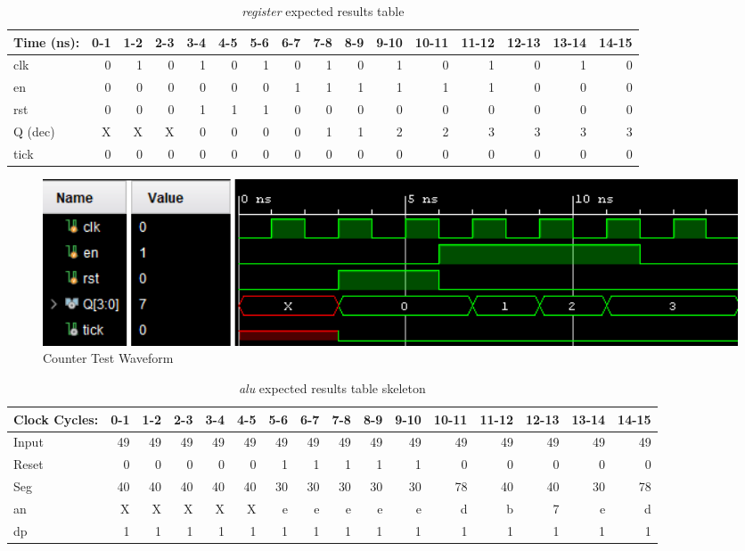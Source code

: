 \documentclass[11pt]{article}
\begin{document}
\begin{table}[ht]\centering
	\caption{\textit{register} expected results table}
	\label{ALU:tbl:register_ERT}\medskip
	\begin{tabular}{l|rrrrrrrrrrrrrrr}
		Time (ns): & 0-1 & 1-2 & 2-3 & 3-4 & 4-5 & 5-6 & 6-7 & 7-8 & 8-9 & 9-10 &10-11& 11-12 & 12-13 & 13-14 & 14-15\\
		\midrule
		clk     & 0 & 1 & 0 & 1 & 0 	& 1 & 0 & 1 & 0 & 1 	& 0 & 1 & 0 & 1 & 0\\
		en  	& 0 & 0 & 0 & 0 & 0 	& 0 & 1 & 1 & 1 & 1 	& 1 & 1 & 0 & 0 & 0\\
		rst 	& 0 & 0 & 0 & 1 & 1 	& 1 & 0 & 0 & 0 & 0 	& 0 & 0 & 0 & 0 & 0\\
		\midrule
		Q (dec) & X & X & X & 0 & 0 	& 0 & 0 & 1 & 1 & 2 	& 2 & 3 & 3 & 3 & 3\\
		tick & 0 & 0 & 0 & 0 & 0 	& 0 & 0 & 0 & 0 & 0 	& 0 & 0 & 0 & 0 & 0\\
		\bottomrule
	\end{tabular}
\end{table}

\begin{figure}[ht]\centering
	\includegraphics[width=1.0\textwidth,trim=0 0mm 0 0,clip]{CounterTest}
	\caption{Counter Test Waveform}
\end{figure}

\clearpage

\begin{table}[ht]\centering
	\caption{\textit{alu} expected results table skeleton}
	\label{ALU:tbl:alu_ERT}\medskip
	\begin{tabular}{l|rrrrrrrrrrrrrrr}
		Clock Cycles:& 0-1 & 1-2 & 2-3 & 3-4 & 4-5 & 5-6 & 6-7 & 7-8 & 8-9 & 9-10 &10-11& 11-12 & 12-13 & 13-14 & 14-15\\
		\midrule
		Input  & 49 & 49 & 49 & 49 & 49 & 49 & 49 & 49 & 49 & 49 & 49 & 49 & 49 & 49 & 49\\
		Reset  & 0 & 0 & 0 & 0 & 0 	& 1 & 1 & 1 & 1 & 1 	& 0 & 0 & 0 & 0 & 0\\
		\midrule
		Seg	& 40 & 40 & 40 & 40 & 40 	& 30 & 30 & 30 & 30 & 30 	& 78 & 40 & 40 & 30 & 78\\
		an & X & X & X & X & X 	& e & e & e & e & e 	& d & b & 7 & e & d\\
		dp  & 1 & 1 & 1 & 1 & 1 	& 1 & 1 & 1 & 1 & 1 	& 1 & 1 & 1 & 1 & 1\\
		\bottomrule
	\end{tabular}
\end{table}
\end{document}
